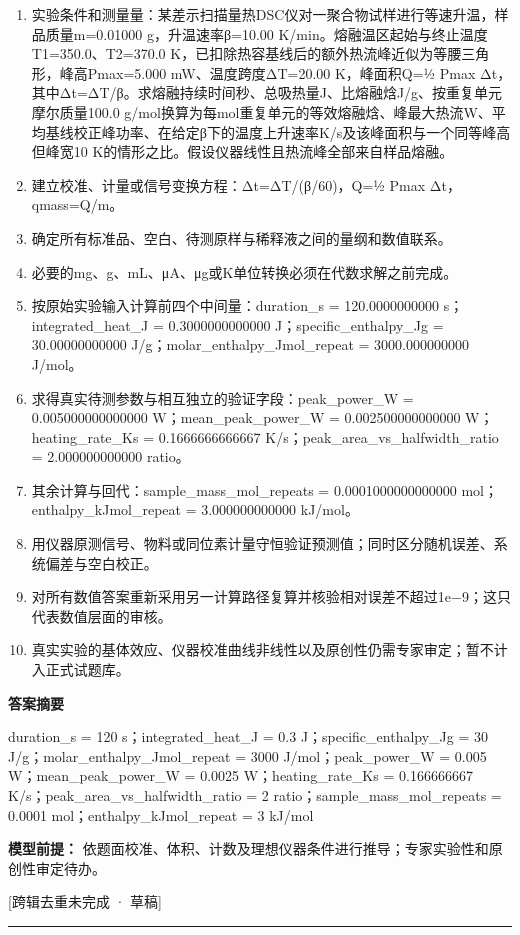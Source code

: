 \documentclass[UTF8,11pt,a4paper]{ctexart}
\begin{document}
\begin{enumerate}
\item 实验条件和测量量：某差示扫描量热DSC仪对一聚合物试样进行等速升温，样品质量m=0.01000 g，升温速率β=10.00 K/min。熔融温区起始与终止温度T1=350.0、T2=370.0 K，已扣除热容基线后的额外热流峰近似为等腰三角形，峰高Pmax=5.000 mW、温度跨度ΔT=20.00 K，峰面积Q=½ Pmax Δt，其中Δt=ΔT/β。求熔融持续时间秒、总吸热量J、比熔融焓J/g、按重复单元摩尔质量100.0 g/mol换算为每mol重复单元的等效熔融焓、峰最大热流W、平均基线校正峰功率、在给定β下的温度上升速率K/s及该峰面积与一个同等峰高但峰宽10 K的情形之比。假设仪器线性且热流峰全部来自样品熔融。
\item 建立校准、计量或信号变换方程：Δt=ΔT/(β/60)，Q=½ Pmax Δt，qmass=Q/m。
\item 确定所有标准品、空白、待测原样与稀释液之间的量纲和数值联系。
\item 必要的mg、g、mL、μA、μg或K单位转换必须在代数求解之前完成。
\item 按原始实验输入计算前四个中间量：duration\_s = 120.0000000000 s；integrated\_heat\_J = 0.3000000000000 J；specific\_enthalpy\_Jg = 30.00000000000 J/g；molar\_enthalpy\_Jmol\_repeat = 3000.000000000 J/mol。
\item 求得真实待测参数与相互独立的验证字段：peak\_power\_W = 0.005000000000000 W；mean\_peak\_power\_W = 0.002500000000000 W；heating\_rate\_Ks = 0.1666666666667 K/s；peak\_area\_vs\_halfwidth\_ratio = 2.000000000000 ratio。
\item 其余计算与回代：sample\_mass\_mol\_repeats = 0.0001000000000000 mol；enthalpy\_kJmol\_repeat = 3.000000000000 kJ/mol。
\item 用仪器原测信号、物料或同位素计量守恒验证预测值；同时区分随机误差、系统偏差与空白校正。
\item 对所有数值答案重新采用另一计算路径复算并核验相对误差不超过1e−9；这只代表数值层面的审核。
\item 真实实验的基体效应、仪器校准曲线非线性以及原创性仍需专家审定；暂不计入正式试题库。
\end{enumerate}
\noindent\textbf{答案摘要}\par
duration\_s = 120 s；integrated\_heat\_J = 0.3 J；specific\_enthalpy\_Jg = 30 J/g；molar\_enthalpy\_Jmol\_repeat = 3000 J/mol；peak\_power\_W = 0.005 W；mean\_peak\_power\_W = 0.0025 W；heating\_rate\_Ks = 0.166666667 K/s；peak\_area\_vs\_halfwidth\_ratio = 2 ratio；sample\_mass\_mol\_repeats = 0.0001 mol；enthalpy\_kJmol\_repeat = 3 kJ/mol\par
\noindent\textbf{模型前提：}
依题面校准、体积、计数及理想仪器条件进行推导；专家实验性和原创性审定待办。\par
\noindent\textcolor{red!65!black}{[跨辑去重未完成 · 草稿]} \par
\medskip\hrule\medskip
\end{document}
